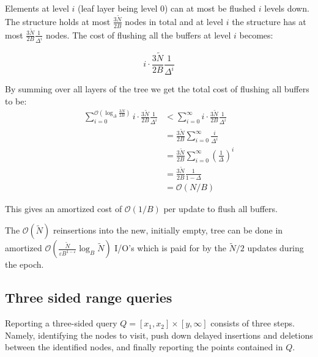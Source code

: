 \documentclass[twoside,11pt,openright]{report}
\def \epsilon {\varepsilon}
\def \bar {\widetilde}
\begin{document}
Elements at level $i$ (leaf layer being level 0) can at most be flushed $i$ levels down.
The structure holds at most $\frac{3\bar{N}}{2B}$ nodes in total and at level $i$ the structure has at most $\frac{3\bar{N}}{2B} \frac{1}{\Delta^i}$ nodes. The cost of flushing all the buffers at level $i$ becomes:

$$ i \cdot \frac{3\bar{N}}{2B} \frac{1}{\Delta^i}$$

By summing over all layers of the tree we get the total cost of flushing all buffers to be:
\begin{align*}
\sum\limits_{i=0}^{\mathcal{O}(\log_\Delta \frac{3N}{2B})} i \cdot \frac{3\bar{N}}{2B} \frac{1}{\Delta^i} &< 
\sum\limits_{i=0}^{\infty} i \cdot \frac{3\bar{N}}{2B} \frac{1}{\Delta^i} \\
&= \frac{3\bar{N}}{2B} \sum\limits_{i=0}^{\infty} \frac{i}{\Delta^i} \\
&= \frac{3\bar{N}}{2B} \sum\limits_{i=0}^{\infty} \left(\frac{1}{\Delta}\right)^i \\
&= \frac{3\bar{N}}{2B} \frac{1}{1-\Delta} \\
&= \mathcal{O}(N/B)
\end{align*}

This gives an amortized cost of $\mathcal{O}(1/B)$ per update to flush all buffers.

The $\mathcal{O}(\bar{N})$ reinsertions into the new, initially empty, tree can be done in amortized $\mathcal{O}(\frac{\bar{N}}{\epsilon B^{1-\epsilon}}\log_B\bar{N})$ I/O's which is paid for by the $\bar{N}/2$ updates during the epoch.

\subsection{Three sided range queries}
\label{subsec:brodal_3_sided}
Reporting a three-sided query $Q = \left[ x_1,x_2 \right] \times \left[y, \infty \right]$ consists of three steps. Namely, identifying the nodes to visit, push down delayed insertions and deletions between the identified nodes, and finally reporting the points contained in $Q$.
\end{document}
